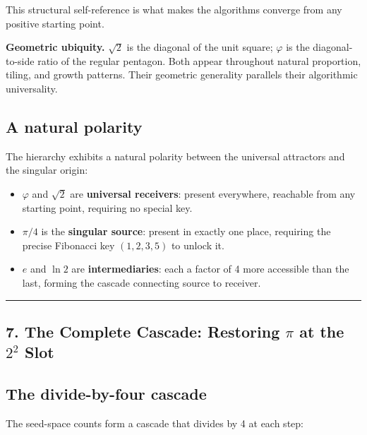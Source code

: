 \documentclass[12pt]{article}
\providecommand{\tightlist}{%
  \setlength{\itemsep}{0pt}\setlength{\parskip}{0pt}}
\begin{document}
This structural self-reference is what makes the algorithms converge
from any positive starting point.

\textbf{Geometric ubiquity.} \(\sqrt{2}\) is the diagonal of the unit
square; \(\varphi\) is the diagonal-to-side ratio of the regular
pentagon. Both appear throughout natural proportion, tiling, and growth
patterns. Their geometric generality parallels their algorithmic
universality.

\subsection{A natural polarity}\label{a-natural-polarity}

The hierarchy exhibits a natural polarity between the universal
attractors and the singular origin:

\begin{itemize}
\tightlist
\item
  \(\varphi\) and \(\sqrt{2}\) are \textbf{universal receivers}: present
  everywhere, reachable from any starting point, requiring no special
  key.
\item
  \(\pi/4\) is the \textbf{singular source}: present in exactly one
  place, requiring the precise Fibonacci key \((1, 2, 3, 5)\) to unlock
  it.
\item
  \(e\) and \(\ln 2\) are \textbf{intermediaries}: each a factor of 4
  more accessible than the last, forming the cascade connecting source
  to receiver.
\end{itemize}

\begin{center}\rule{0.5\linewidth}{0.5pt}\end{center}

\subsection{\texorpdfstring{7. The Complete Cascade: Restoring \(\pi\)
at the \(2^2\)
Slot}{7. The Complete Cascade: Restoring \textbackslash pi at the 2\^{}2 Slot}}\label{the-complete-cascade-restoring-pi-at-the-22-slot}

\subsection{The divide-by-four cascade}\label{the-divide-by-four-cascade}

The seed-space counts form a cascade that divides by 4 at each step:
\end{document}
